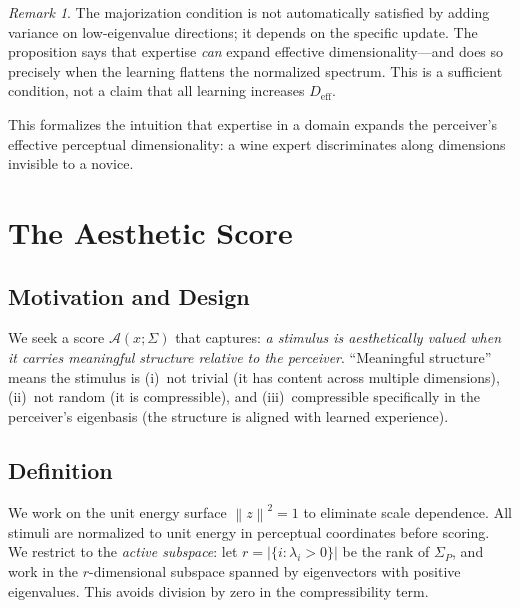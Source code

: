 \documentclass[journal]{IEEEtran}
\theoremstyle{definition}
\theoremstyle{remark}
\newtheorem{remark}[theorem]{Remark}
\newcommand{\norm}[1]{\left\lVert #1 \right\rVert}
\begin{document}
\begin{remark}
The majorization condition is not automatically satisfied by
adding variance on low-eigenvalue directions; it depends on the
specific update.  The proposition says that expertise
\emph{can} expand effective dimensionality---and does so precisely
when the learning flattens the normalized spectrum.  This is a
sufficient condition, not a claim that all learning increases
$D_{\mathrm{eff}}$.
\end{remark}

This formalizes the intuition that expertise in a domain expands
the perceiver's effective perceptual dimensionality: a wine expert
discriminates along dimensions invisible to a novice.


\section{The Aesthetic Score}
\label{sec:score}

\subsection{Motivation and Design}

We seek a score $\mathcal{A}(x; \Sigma)$ that captures: \emph{a
stimulus is aesthetically valued when it carries meaningful
structure relative to the perceiver}.  ``Meaningful structure'' means
the stimulus is (i)~not trivial (it has content across multiple
dimensions), (ii)~not random (it is compressible), and
(iii)~compressible specifically in the perceiver's eigenbasis
(the structure is aligned with learned experience).

\subsection{Definition}

We work on the unit energy surface $\norm{z}^2 = 1$ to eliminate
scale dependence.  All stimuli are normalized to unit energy in
perceptual coordinates before scoring.  We restrict to the
\emph{active subspace}: let $r = |\{i : \lambda_i > 0\}|$ be the
rank of $\Sigma_P$, and work in the $r$-dimensional subspace
spanned by eigenvectors with positive eigenvalues.  This avoids
division by zero in the compressibility term.
\end{document}

